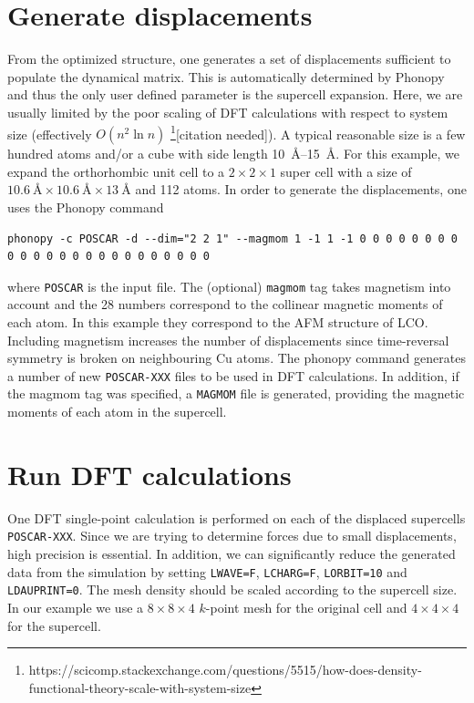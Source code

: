 \section{Generate displacements}
From the optimized structure, one generates a set of displacements sufficient to populate the dynamical matrix. This is automatically determined by Phonopy and thus the only user defined parameter is the supercell expansion. Here, we are usually limited by the poor scaling of DFT calculations with respect to system size (effectively $O(n^2 \ln n)$ \footnote{https://scicomp.stackexchange.com/questions/5515/how-does-density-functional-theory-scale-with-system-size}[citation needed]). A typical reasonable size is a few hundred atoms and/or a cube with side length \SIrange{10}{15}{\angstrom}. For this example, we expand the orthorhombic unit cell to a $2 \times 2 \times 1$ super cell with a size of $\SI{10.6}{\angstrom} \times \SI{10.6}{\angstrom} \times \SI{13}{\angstrom}$ and 112 atoms. In order to generate the displacements, one uses the Phonopy command
\begin{lstlisting}
phonopy -c POSCAR -d --dim="2 2 1" --magmom 1 -1 1 -1 0 0 0 0 0 0 0 0 0 0 0 0 0 0 0 0 0 0 0 0 0 0 0 0
\end{lstlisting}

\noindent where \texttt{POSCAR} is the input file. The (optional) \texttt{magmom} tag takes magnetism into account and the 28 numbers correspond to the collinear magnetic moments of each atom. In this example they correspond to the AFM structure of LCO. Including magnetism increases the number of displacements since time-reversal symmetry is broken on neighbouring Cu atoms. The phonopy command generates a number of new \texttt{POSCAR-XXX} files to be used in DFT calculations. In addition, if the magmom tag was specified, a \texttt{MAGMOM} file is generated, providing the magnetic moments of each atom in the supercell.

\section{Run DFT calculations}
One DFT single-point calculation is performed on each of the displaced supercells \texttt{POSCAR-XXX}. Since we are trying to determine forces due to small displacements, high precision is essential. In addition, we can significantly reduce the generated data from the simulation by setting \texttt{LWAVE=F}, \texttt{LCHARG=F}, \texttt{LORBIT=10} and \texttt{LDAUPRINT=0}. The mesh density should be scaled according to the supercell size. In our example we use a $8 \times 8 \times 4$ $k$-point mesh for the original cell and $4 \times 4 \times 4$ for the supercell.

